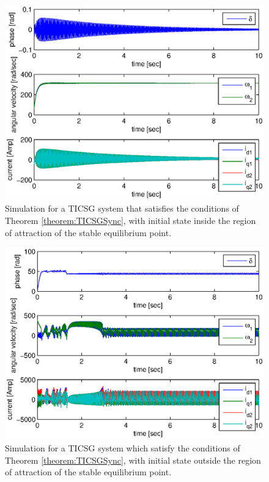 \documentclass[letterpaper, 10 pt, conference]{ieeeconf}
\begin{document}
\vspace{-4mm}
\begin{figure}[ht]
\includegraphics[scale=0.65]{InROATICSGSimulation}
\caption{Simulation for a TICSG system that satisfies the conditions
of Theorem \ref{theorem:TICSGSync}, with initial state inside the 
region of attraction of the stable equilibrium point.}
\label{fig:InROATICSGSimulation}
\end{figure}

\vspace{-4mm}
\begin{figure}[ht]
\includegraphics[scale=0.65]{OutROATICSGSimulation}

\caption{Simulation for a TICSG system which satisfy the conditions of
Theorem \ref{theorem:TICSGSync}, with initial state outside the region
of attraction of the stable equilibrium point.}
\label{fig:OutROATICSGSimulation}
\end{figure}
\end{document}
